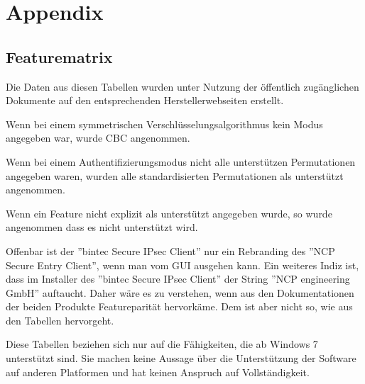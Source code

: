 



\section{Appendix}
\label{sec:appendix}

\subsection{Featurematrix}
\label{subsec:featurematrix}
Die Daten aus diesen Tabellen wurden unter Nutzung der öffentlich zugänglichen
Dokumente auf den entsprechenden Herstellerwebseiten erstellt.

Wenn bei einem symmetrischen Verschlüsselungsalgorithmus kein Modus angegeben
war, wurde \ac{CBC} angenommen.

Wenn bei einem Authentifizierungsmodus nicht alle unterstützen Permutationen
angegeben waren, wurden alle standardisierten Permutationen als unterstützt 
angenommen.

Wenn ein Feature nicht explizit als unterstützt angegeben wurde, so wurde angenommen
dass es nicht unterstützt wird.

Offenbar ist der ''bintec Secure IPsec Client'' nur ein Rebranding des ''NCP Secure Entry Client'',
wenn man vom \ac{GUI} ausgehen kann. 
Ein weiteres Indiz ist, dass im Installer des ''bintec Secure IPsec Client''
der String ''NCP engineering GmbH'' auftaucht. Daher wäre es zu verstehen,
wenn aus den Dokumentationen der beiden Produkte Featureparität hervorkäme.
Dem ist aber nicht so, wie aus den Tabellen hervorgeht.

Diese Tabellen beziehen sich nur auf die Fähigkeiten, die ab Windows 7 unterstützt sind.
Sie machen keine Aussage über die Unterstützung der Software auf anderen Platformen
und hat keinen Anspruch auf Vollständigkeit.

